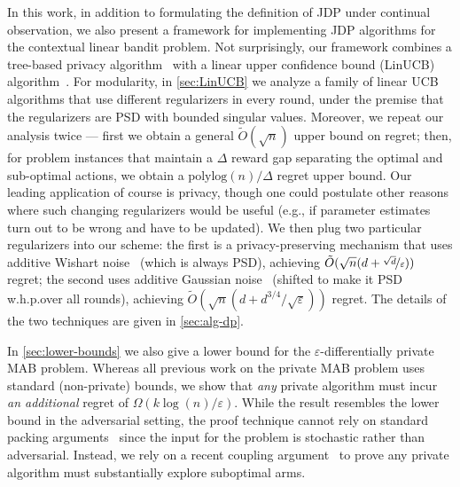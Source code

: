 \documentclass{article}
\begin{document}
In this work, in addition to formulating the definition of JDP under
continual observation, we also present a framework for implementing
JDP algorithms for the contextual linear bandit problem. Not
surprisingly, our framework combines a tree-based privacy
algorithm~\citep{ChanPrivateContinualRelease2010,DworkContinualObservation2010}
with a linear upper confidence bound (LinUCB)
algorithm~\cite{DaniStochasticLinearOptimization2008}.  For
modularity, in \cref{sec:LinUCB} we analyze a family of linear
UCB algorithms that use different regularizers in every round, under
the premise that the regularizers are PSD with bounded singular
values.  Moreover, we repeat our analysis twice --- first we obtain a
general $\tilde O(\sqrt n)$ upper bound on regret; then, for problem
instances that maintain a $\Delta$ reward gap separating the optimal
and sub-optimal actions, we obtain a $\mathrm{polylog}(n)/\Delta$
regret upper bound.
Our leading application of course is privacy, though one could
postulate other reasons where such changing regularizers would be
useful (e.g., if parameter estimates turn out to be wrong and have to
be updated).  We then plug two particular regularizers into our
scheme: the first is a privacy-preserving mechanism that uses additive
Wishart noise~\citep{SheffetPrivateApproxRegression2015} (which is
always PSD), achieving
$\tilde O(\sqrt{n}(d+\nicefrac{\sqrt d}{\varepsilon}))$ regret; the
second uses additive Gaussian noise~\citep{DworkAnalyzeGauss2014}
(shifted to make it PSD w.h.p.\@ over all rounds), achieving
$\tilde O(\sqrt n(d + d^{3/4}/\sqrt\varepsilon))$ regret.  The details
of the two techniques are given in \cref{sec:alg-dp}.

In \cref{sec:lower-bounds} we also give a lower bound for the
$\varepsilon$-differentially private MAB problem. Whereas all previous
work on the private MAB problem uses standard (non-private) bounds, we
show that \emph{any} private algorithm must incur \emph{an additional}
regret of $\Omega(k\log(n)/\varepsilon)$. While the result resembles
the lower bound in the adversarial setting, the proof technique cannot
rely on standard packing
arguments~\citep[e.g.][]{HardtTalwarGeometryDP2010} since the input
for the problem is stochastic rather than adversarial.  Instead, we
rely on a recent coupling
argument~\citep{KarwaVadhanFiniteSampleDP2017} to prove any private
algorithm must substantially explore suboptimal arms.
\end{document}
